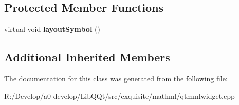 \subsection*{Protected Member Functions}
\begin{DoxyCompactItemize}
\item 
\mbox{\label{class_mml_msubsup_node_a94e9c4a6ff1d38e73751abe136fa43fb}} 
virtual void {\bfseries layout\+Symbol} ()
\end{DoxyCompactItemize}
\subsection*{Additional Inherited Members}


The documentation for this class was generated from the following file\+:\begin{DoxyCompactItemize}
\item 
R\+:/\+Develop/a0-\/develop/\+Lib\+Q\+Qt/src/exquisite/mathml/qtmmlwidget.\+cpp\end{DoxyCompactItemize}
